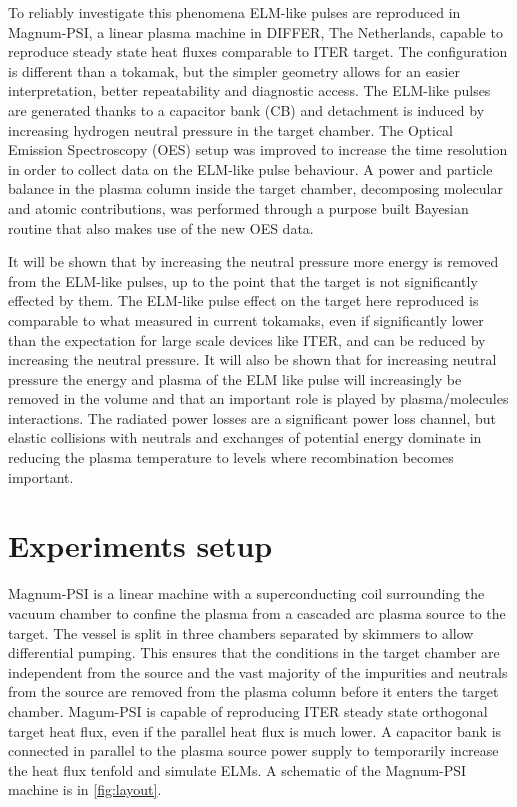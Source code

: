 To reliably investigate this phenomena ELM-like pulses are reproduced in Magnum-PSI, a linear plasma machine in DIFFER, The Netherlands, capable to reproduce steady state heat fluxes comparable to ITER target. The configuration is different than a tokamak, but the simpler geometry allows for an easier interpretation, better repeatability and diagnostic access. The ELM-like pulses are generated thanks to a capacitor bank (CB) and detachment is induced by increasing hydrogen neutral pressure in the target chamber.
The Optical Emission Spectroscopy (OES) setup was improved to increase the time resolution in order to collect data on the ELM-like pulse behaviour. A power and particle balance in the plasma column inside the target chamber, decomposing molecular and atomic contributions, was performed through a purpose built Bayesian routine that also makes use of the new OES data.

It will be shown that by increasing the neutral pressure more energy is removed from the ELM-like pulses, up to the point that the target is not significantly effected by them. The ELM-like pulse effect on the target here reproduced is comparable to what measured in current tokamaks, even if significantly lower than the expectation for large scale devices like ITER, and can be reduced by increasing the neutral pressure.
It will also be shown that for increasing neutral pressure the energy and plasma of the ELM like pulse will increasingly be removed in the volume and that an important role is played by plasma/molecules interactions. The radiated power losses are a significant power loss channel, but elastic collisions with neutrals and exchanges of potential energy dominate in reducing the plasma temperature to levels where recombination becomes important.

\section{Experiments setup}\label{Experiments setup}

Magnum-PSI is a linear machine with a superconducting coil surrounding the vacuum chamber to confine the plasma from a cascaded arc plasma source to the target. The vessel is split in three chambers separated by skimmers to allow differential pumping. This ensures that the conditions in the target chamber are independent from the source and the vast majority of the impurities and neutrals from the source are removed from the plasma column before it enters the target chamber. \cite{Scholten2013} Magum-PSI is capable of reproducing ITER steady state orthogonal target heat flux, even if the parallel heat flux is much lower. \cite{Scholten2013} A capacitor bank is connected in parallel to the plasma source power supply to temporarily increase the heat flux tenfold and simulate ELMs. \cite{Morgan2014} A schematic of the Magnum-PSI machine is in \autoref{fig:layout}.

